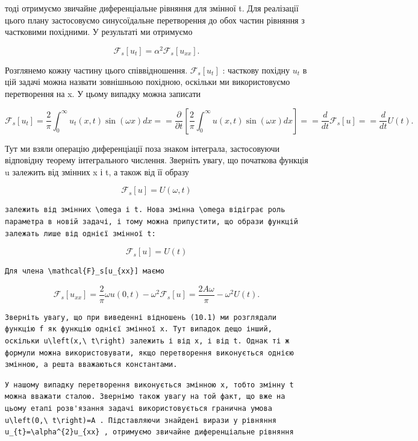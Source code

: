 \documentclass[
  ukrainian,
]{article}
\begin{document}
тоді отримуємо звичайне диференціальне рівняння для змінної t. Для
реалізації цього плану застосовуємо синусоїдальне перетворення до обох
частин рівняння з частковими похідними. У результаті ми отримуємо

\[
\mathcal{F}_s[u_t] = \alpha^2 \mathcal{F}_s[u_{xx}].
\]

Розглянемо кожну частину цього співвідношення. \(\mathcal{F}_s[u_t]\) :
часткову похідну \(u_t\) в цій задачі можна назвати зовнішньою похідною,
оскільки ми використовуємо перетворення на x. У цьому випадку можна
записати

\[
\mathcal{F}_{s}\left[u_{t}\right] = \frac{2}{\pi} \int_{0}^{\infty} u_{t}\left(x, t\right) \sin\left(\omega x\right) dx =
= \frac{\partial}{\partial t} \left[\frac{2}{\pi} \int_{0}^{\infty} u\left(x, t\right) \sin\left(\omega x\right) dx\right] =
= \frac{d}{dt} \mathcal{F}_{s}\left[u\right] =
= \frac{d}{dt} U\left(t\right).
\]

Тут ми взяли операцію диференціації поза знаком інтеграла, застосовуючи
відповідну теорему інтегрального числення. Зверніть увагу, що початкова
функція u залежить від змінних x і t, а також від її образу

\[
\mathcal{F}_{s}[u] = U(\omega, t)
\]

\begin{verbatim}
залежить від змінних \omega і t. Нова змінна \omega відіграє роль параметра в новій задачі, і тому можна припустити, що образи функцій залежать лише від однієї змінної t:
\end{verbatim}

\[
\mathcal{F}_s[u] = U(t)
\]

\begin{verbatim}
Для члена \mathcal{F}_s[u_{xx}] маємо
\end{verbatim}

\[
\mathcal{F}_s[u_{xx}] = \frac{2}{\pi}\omega u(0,t) - \omega^2 \mathcal{F}_s[u]
= \frac{2A\omega}{\pi} - \omega^2 U(t).
\]

\begin{verbatim}
Зверніть увагу, що при виведенні відношень (10.1) ми розглядали функцію f як функцію однієї змінної x. Тут випадок дещо інший, оскільки u\left(x,\ t\right) залежить і від x, і від t. Однак ті ж формули можна використовувати, якщо перетворення виконується однією змінною, а решта вважаються константами.
\end{verbatim}

\begin{verbatim}
У нашому випадку перетворення виконується змінною x, тобто змінну t можна вважати сталою. Звернімо також увагу на той факт, що вже на цьому етапі розв'язання задачі використовується гранична умова u\left(0,\ t\right)=A . Підставляючи знайдені вирази у рівняння u_{t}=\alpha^{2}u_{xx} , отримуємо звичайне диференціальне рівняння
\end{verbatim}
\end{document}
